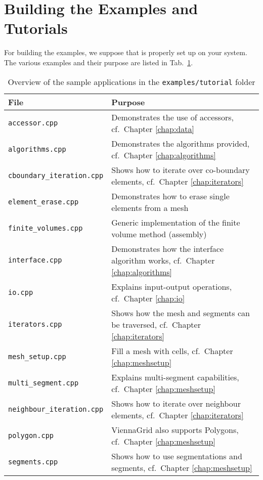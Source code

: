 \section{Building the Examples and Tutorials}
For building the examples, we suppose that {\CMake} is properly set up
on your system. The various examples and their purpose are listed in
Tab.~\ref{tab:tutorial-dependencies}.

\begin{table}[tb]
\begin{center}
\begin{tabular}{l|p{9.3cm}}
File & Purpose\\
\hline
\texttt{accessor.cpp}              & Demonstrates the use of accessors, cf.~Chapter \ref{chap:data} \\
\texttt{algorithms.cpp}            & Demonstrates the algorithms provided, cf.~Chapter \ref{chap:algorithms} \\
\texttt{cboundary\_iteration.cpp}  & Shows how to iterate over co-boundary elements, cf.~Chapter \ref{chap:iterators} \\
\texttt{element\_erase.cpp}        & Demonstrates how to erase single elements from a mesh \\
\texttt{finite\_volumes.cpp}       & Generic implementation of the finite volume method (assembly) \\
\texttt{interface.cpp}             & Demonstrates how the interface algorithm works, cf.~Chapter \ref{chap:algorithms} \\
\texttt{io.cpp}                    & Explains input-output operations, cf.~Chapter \ref{chap:io} \\
\texttt{iterators.cpp}             & Shows how the mesh and segments can be traversed, cf.~Chapter \ref{chap:iterators} \\
\texttt{mesh\_setup.cpp}           & Fill a mesh with cells, cf.~Chapter \ref{chap:meshsetup} \\
\texttt{multi\_segment.cpp}        & Explains multi-segment capabilities, cf.~Chapter \ref{chap:meshsetup} \\
\texttt{neighbour\_iteration.cpp}  & Shows how to iterate over neighbour elements, cf.~Chapter \ref{chap:iterators} \\
\texttt{polygon.cpp}               & ViennaGrid also supports Polygons, cf.~Chapter \ref{chap:meshsetup} \\
\texttt{segments.cpp}              & Shows how to use segmentations and segments, cf.~Chapter \ref{chap:meshsetup}
\end{tabular}
\caption{Overview of the sample applications in the \texttt{examples/tutorial} folder}
\label{tab:tutorial-dependencies}
\end{center}
\end{table}

